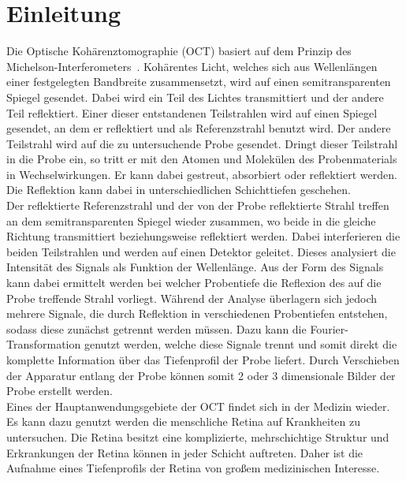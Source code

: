\section{Einleitung}

Die Optische Kohärenztomographie (OCT) basiert auf dem Prinzip des Michelson-In\-ter\-fe\-ro\-me\-ters~\cite{OCT}. Kohärentes Licht, welches sich aus Wellenlängen einer festgelegten Bandbreite zusammensetzt, wird auf einen semitransparenten Spiegel gesendet. Dabei wird ein Teil des Lichtes transmittiert und der andere Teil reflektiert. Einer dieser entstandenen Teilstrahlen wird auf einen Spiegel gesendet, an dem er reflektiert und als Referenzstrahl benutzt wird. Der andere Teilstrahl wird auf die zu untersuchende Probe gesendet. Dringt dieser Teilstrahl in die Probe ein, so tritt er mit den Atomen und Molekülen des Probenmaterials in Wechselwirkungen. Er kann dabei gestreut, absorbiert oder reflektiert werden. Die Reflektion kann dabei in unterschiedlichen Schichttiefen geschehen. \\
Der reflektierte Referenzstrahl und der von der Probe reflektierte Strahl treffen an dem semitransparenten Spiegel wieder zusammen, wo beide in die gleiche Richtung transmittiert beziehungsweise reflektiert werden. Dabei interferieren die beiden Teilstrahlen und werden auf einen Detektor geleitet. Dieses analysiert die Intensität des Signals als Funktion der Wellenlänge. Aus der Form des Signals kann dabei ermittelt werden bei welcher Probentiefe die Reflexion des auf die Probe treffende Strahl vorliegt. Während der Analyse überlagern sich jedoch mehrere Signale, die durch Reflektion in verschiedenen Probentiefen entstehen, sodass diese zunächst getrennt werden müssen. Dazu kann die Fourier-Transformation genutzt werden, welche diese Signale trennt und somit direkt die komplette Information über das Tiefenprofil der Probe liefert. Durch Verschieben der Apparatur entlang der Probe können somit 2 oder 3 dimensionale Bilder der Probe erstellt werden. \\
Eines der Hauptanwendungsgebiete der OCT findet sich in der Medizin wieder. Es kann dazu genutzt werden die menschliche Retina auf Krankheiten zu untersuchen. Die Retina besitzt eine komplizierte, mehrschichtige Struktur und Erkrankungen der Retina können in jeder Schicht auftreten. Daher ist die Aufnahme eines Tiefenprofils der Retina von großem medizinischen Interesse. \\

